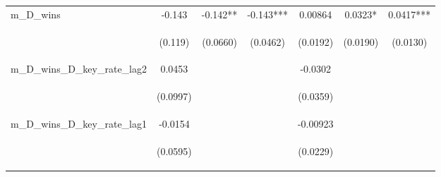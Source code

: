 \documentclass[]{article}
\begin{document}
\begin{center}
\begin{tabular}{lcccccc}
m\_D\_wins & -0.143 & -0.142** & -0.143*** & 0.00864 & 0.0323* & 0.0417*** \\
\vspace{4pt} & \begin{footnotesize}(0.119)\end{footnotesize} & \begin{footnotesize}(0.0660)\end{footnotesize} & \begin{footnotesize}(0.0462)\end{footnotesize} & \begin{footnotesize}(0.0192)\end{footnotesize} & \begin{footnotesize}(0.0190)\end{footnotesize} & \begin{footnotesize}(0.0130)\end{footnotesize} \\
m\_D\_wins\_D\_key\_rate\_lag2 & 0.0453 &  &  & -0.0302 &  &  \\
\vspace{4pt} & \begin{footnotesize}(0.0997)\end{footnotesize} & \begin{footnotesize}\end{footnotesize} & \begin{footnotesize}\end{footnotesize} & \begin{footnotesize}(0.0359)\end{footnotesize} & \begin{footnotesize}\end{footnotesize} & \begin{footnotesize}\end{footnotesize} \\
m\_D\_wins\_D\_key\_rate\_lag1 & -0.0154 &  &  & -0.00923 &  &  \\
\vspace{4pt} & \begin{footnotesize}(0.0595)\end{footnotesize} & \begin{footnotesize}\end{footnotesize} & \begin{footnotesize}\end{footnotesize} & \begin{footnotesize}(0.0229)\end{footnotesize} & \begin{footnotesize}\end{footnotesize} & \begin{footnotesize}\end{footnotesize} \\

\end{tabular}
\end{center}
\end{document}
